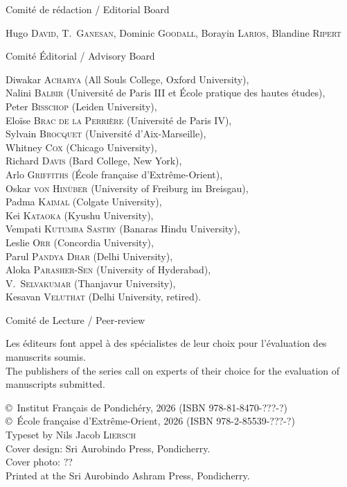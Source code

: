 \newpage
\thispagestyle{empty}
{\footnotesize
\noindent
Comité de rédaction / Editorial Board

\smallskip\noindent
Hugo \textsc{David},
T.~\textsc{Ganesan},
Dominic \textsc{Goodall},
Borayin \textsc{Larios},
Blandine \textsc{Ripert}

\bigskip\noindent
Comité Éditorial / Advisory Board 
 
\smallskip\noindent
Diwakar \textsc{Acharya} (All Souls College, Oxford University),\\ 
Nalini \textsc{Balbir} (Université de Paris III et École pratique des hautes études),\\ 
Peter \textsc{Bisschop} (Leiden University),\\ 
Eloïse \textsc{Brac de la Perrière} (Université de Paris IV),\\
Sylvain \textsc{Brocquet} (Université d’Aix-Marseille),\\
Whitney \textsc{Cox} (Chicago University),\\
Richard \textsc{Davis} (Bard College, New York),\\
Arlo \textsc{Griffiths} (École française d’Extrême-Orient),\\ 
Oskar \textsc{von Hinüber} (University of Freiburg im Breisgau),\\ 
Padma \textsc{Kaimal} (Colgate University),\\ 
Kei \textsc{Kataoka} (Kyushu University),\\ 
Vempati \textsc{Kutumba Sastry} (Banaras Hindu University),\\ 
Leslie \textsc{Orr} (Concordia University),\\ 
Parul \textsc{Pandya Dhar} (Delhi University),\\
Aloka \textsc{Parasher-Sen} (University of Hyderabad),\\ 
V.\ \textsc{Selvakumar} (Thanjavur University),\\
Kesavan \textsc{Veluthat} (Delhi University, retired).

\bigskip\noindent
Comité de Lecture / Peer-review

\smallskip\noindent
Les éditeurs font appel à des spécialistes de leur choix pour l’évaluation des manuscrits soumis.\\
The publishers of the series call on experts of their choice for the evaluation of manuscripts submitted.

\vfill

\noindent
\copyright\ Institut Français de Pondichéry, 2026 (ISBN 978-81-8470-???-?)\\
\copyright\ École française d’Extrême-Orient, 2026 (ISBN 978-2-85539-???-?)\\

\bigskip\noindent
Typeset by Nils Jacob \textsc{Liersch}\\
Cover design: Sri Aurobindo Press, Pondicherry.\\
Cover photo: ??\\
Printed at the Sri Aurobindo Ashram Press, Pondicherry.}
